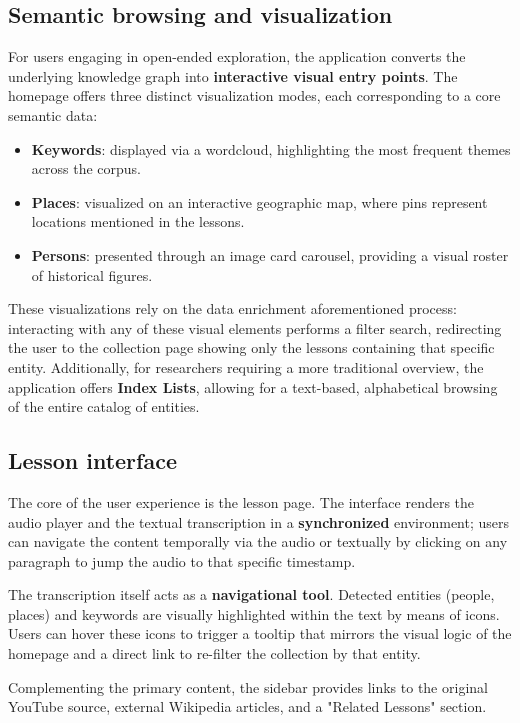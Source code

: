 \documentclass[11pt]{article}
\begin{document}
\subsection{Semantic browsing and visualization}
For users engaging in open-ended exploration, the application converts the underlying knowledge graph into \textbf{interactive visual entry points}. The homepage offers three distinct visualization modes, each corresponding to a core semantic data:

\begin{itemize}
\item \textbf{Keywords}: displayed via a wordcloud, highlighting the most frequent themes across the corpus.
\item \textbf{Places}: visualized on an interactive geographic map, where pins represent locations mentioned in the lessons.
\item \textbf{Persons}: presented through an image card carousel, providing a visual roster of historical figures.
\end{itemize}

These visualizations rely on the data enrichment aforementioned process: interacting with any of these visual elements performs a filter search, redirecting the user to the collection page showing only the lessons containing that specific entity. Additionally, for researchers requiring a more traditional overview, the application offers \textbf{Index Lists}, allowing for a text-based, alphabetical browsing of the entire catalog of entities.


\subsection{Lesson interface}
The core of the user experience is the lesson page. The interface renders the audio player and the textual transcription in a \textbf{synchronized} environment; users can navigate the content temporally via the audio or textually by clicking on any paragraph to jump the audio to that specific timestamp.

The transcription itself acts as a \textbf{navigational tool}. Detected entities (people, places) and keywords are visually highlighted within the text by means of icons. Users can hover these icons to trigger a tooltip that mirrors the visual logic of the homepage and a direct link to re-filter the collection by that entity.

Complementing the primary content, the sidebar provides links to the original YouTube source, external Wikipedia articles, and a "Related Lessons" section.
\end{document}
